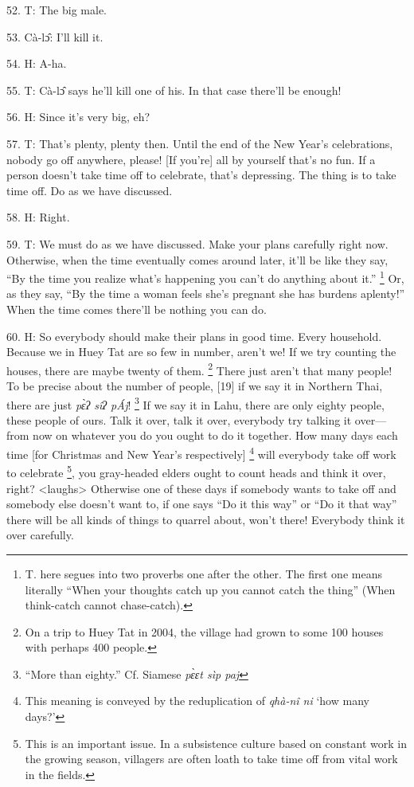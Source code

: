 52. T: The big male.

53. Cà-lɔ̂: I'll kill it.

54. H: A-ha.

55. T: Cà-lɔ̂ says he'll kill one of his.  In that case there'll be enough!

56. H: Since it's very big, eh?

57. T: That's plenty, plenty then.  Until the end of the New Year's celebrations,
nobody go off anywhere, please!  [If you're] all by yourself that's no fun.  If
a person doesn't take time off to celebrate, that's depressing.  The thing is to
take time off.  Do as we have discussed.

58. H: Right.

59. T: We must do as we have discussed.  Make your plans carefully right now.
Otherwise, when the time eventually comes around later, it'll be like they say,
``By the time you realize what's happening you can't do anything about it.'' \footnote{T. here segues into two proverbs one after the other.  The first one means literally ``When your thoughts catch up you cannot catch the thing'' (When think-catch cannot chase-catch).}
Or, as they say, ``By the time a woman feels she's pregnant she has burdens aplenty!''
When the time comes there'll be nothing you can do.

60. H: So everybody should make their plans in good time.  Every household.  Because
we in Huey Tat are so few in number, aren't we!  If we try counting the houses,
there are maybe twenty of them. \footnote{On a trip to Huey Tat in 2004, the village had grown to some 100 houses with perhaps 400 people.} There just aren't that many people!  To be
precise about the number of people, [19] if we say it in Northern Thai, there are
just \textit{pɛ̀ʔ sîʔ pÁj}! \footnote{``More than eighty.'' Cf. Siamese \textit{pɛ̀ɛt sìp paj}} If we say it in Lahu, there are only eighty
people, these people of ours.  Talk it over, talk it over, everybody try talking
it over---from now on whatever you do you ought to do it together.  How many days
each time [for Christmas and New Year's respectively] \footnote{This meaning is conveyed by the reduplication of \textit{qhà-nî ni }`how many days?'} will everybody take
off work to celebrate \footnote{This is an important issue.  In a subsistence culture based on constant work in the growing season, villagers are often loath to take time off from vital work in the fields.}, you gray-headed elders ought to count heads and think
it over, right? <laughs> Otherwise one of these days if somebody
wants to take off and somebody else doesn't want to, if one says ``Do it this way''
or ``Do it that way'' there will be all kinds of things to quarrel about, won't
there!  Everybody think it over carefully.

